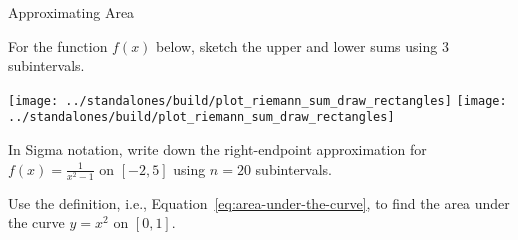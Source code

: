 \documentclass[../main.tex]{subfiles}
\begin{document}
\begin{lesson}{Approximating Area}
\begin{example}
  \end{example}
  \clearpage

  \begin{example}
    For the function \(f(x)\) below, sketch the upper and lower sums using \(3\) subintervals.

    \hfill{}
    \texttt{[image: ../standalones/build/plot\_riemann\_sum\_draw\_rectangles]}
    \hfill{}
    \texttt{[image: ../standalones/build/plot\_riemann\_sum\_draw\_rectangles]}
    \hfill{}

  \end{example}

  \begin{example}
    In Sigma notation, write down the right-endpoint approximation for \(f(x) = \frac{1}{x^{2} - 1}\) on \([-2, 5]\) using \(n = 20\) subintervals.
  \end{example}
  \clearpage

  \begin{example}
    Use the definition, i.e., Equation~\eqref{eq:area-under-the-curve}, to find the area under the curve \(y = x^{2}\) on \([0,1]\).

  \end{example}
\end{lesson}
\end{document}
